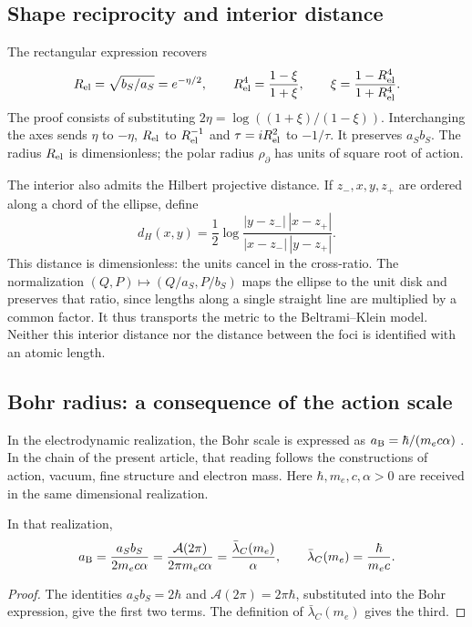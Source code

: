 \subsection{Shape reciprocity and interior distance}

The rectangular expression recovers
\begin{equation}
 R_{\rm el}=\sqrt{b_S/a_S}=e^{-\eta/2},\qquad
 R_{\rm el}^4=\frac{1-\xi}{1+\xi},\qquad
 \xi=\frac{1-R_{\rm el}^4}{1+R_{\rm el}^4}.
 \label{ii:eq:ii-elipse-reciproca}
\end{equation}
The proof consists of substituting \(2\eta=\log((1+\xi)/(1-\xi))\). Interchanging the axes sends \(\eta\) to \(-\eta\), \(R_{\rm el}\) to \(R_{\rm el}^{-1}\) and \(\tau=iR_{\rm el}^2\) to \(-1/\tau\). It preserves \(a_Sb_S\). The radius \(R_{\rm el}\) is dimensionless; the polar radius \(\rho_{\partial}\) has units of square root of action.

The interior also admits the Hilbert projective distance. If \(z_-,x,y,z_+\) are ordered along a chord of the ellipse, define
\[
 d_H(x,y)=\frac12\log
 \frac{|y-z_-|\,|x-z_+|}{|x-z_-|\,|y-z_+|}.
\]
This distance is dimensionless: the units cancel in the cross-ratio. The normalization \((Q,P)\mapsto(Q/a_S,P/b_S)\) maps the ellipse to the unit disk and preserves that ratio, since lengths along a single straight line are multiplied by a common factor. It thus transports the metric to the Beltrami--Klein model. Neither this interior distance nor the distance between the foci is identified with an atomic length.

\subsection{Bohr radius: a consequence of the action scale}
\label{ii:sec:ii-elipse-bohr}

In the electrodynamic realization, the Bohr scale is expressed as \(a_{\rm B}=\hbar/(m_ec\alpha)\) \cite{ii:codata2022}. In the chain of the present article, that reading follows the constructions of action, vacuum, fine structure and electron mass. Here \(\hbar,m_e,c,\alpha>0\) are received in the same dimensional realization.
\begin{proposition}
\label{ii:prop:ii-elipse-bohr}
In that realization,
\begin{equation}
 a_{\rm B}=\frac{a_Sb_S}{2m_ec\alpha}
 =\frac{\mathcal A(2\pi)}{2\pi m_ec\alpha}
 =\frac{\bar\lambda_C(m_e)}{\alpha},\qquad
 \bar\lambda_C(m_e)=\frac{\hbar}{m_ec}.
 \label{ii:eq:ii-elipse-bohr}
\end{equation}
\end{proposition}
\begin{proof}
The identities \(a_Sb_S=2\hbar\) and \(\mathcal A(2\pi)=2\pi\hbar\), substituted into the Bohr expression, give the first two terms. The definition of \(\bar\lambda_C(m_e)\) gives the third.
\end{proof}

